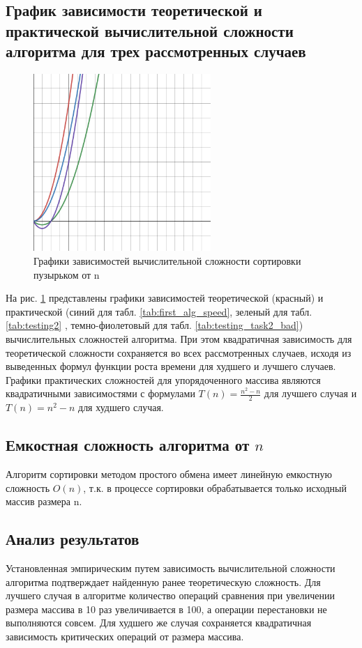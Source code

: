 \documentclass[14pt]{extarticle}
\begin{document}
\subsection{График зависимости теоретической и практической
вычислительной сложности алгоритма для трех рассмотренных случаев}

\begin{figure}[htpb]
  \centering
  \includegraphics[width=0.6\textwidth]{pictures/desmos_second.png}
  \caption{Графики зависимостей вычислительной сложности сортировки пузырьком от n}
  \label{fig:graph_2}
\end{figure}

На рис. \ref{fig:graph_2} представлены графики зависимостей теоретической (красный) и
практической (синий для табл. \ref{tab:first_alg_speed},
зеленый для табл. \ref{tab:testing2} , темно-фиолетовый для табл. \ref{tab:testing_task2_bad})
вычислительных сложностей алгоритма. При этом квадратичная зависимость
для теоретической сложности сохраняется во всех рассмотренных случаев,
исходя из выведенных формул функции роста времени для худшего и лучшего
случаев. Графики практических сложностей для упорядоченного массива
являются квадратичными зависимостями с формулами $T(n) = \frac{n^2-n}{2}$
для лучшего случая и  $T(n) = n^2-n$ для худшего случая.

\subsection{Емкостная сложность алгоритма от $n$ }
Алгоритм сортировки методом простого обмена имеет линейную емкостную сложность
$O(n)$, т.к. в процессе сортировки обрабатывается только исходный массив размера n.
\subsection{Анализ результатов}
Установленная эмпирическим путем зависимость вычислительной
сложности алгоритма подтверждает найденную ранее теоретическую
сложность. Для лучшего случая в алгоритме количество операций сравнения
при увеличении размера массива в 10 раз увеличивается в 100, а операции
перестановки не выполняются совсем. Для худшего же случая сохраняется
квадратичная зависимость критических операций от размера массива.
\end{document}
